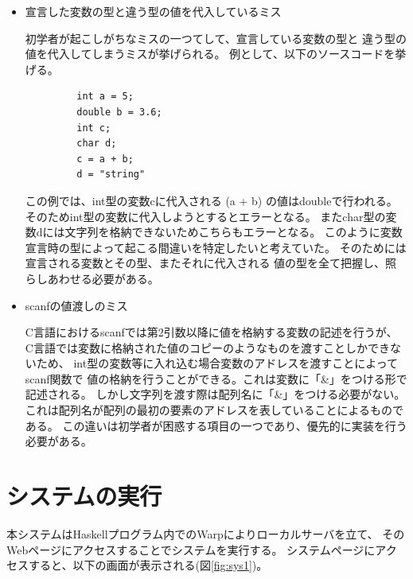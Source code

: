 \documentclass{csspaper}
\begin{document}
\begin{itemize}
         \item 宣言した変数の型と違う型の値を代入しているミス
         
         初学者が起こしがちなミスの一つてして、宣言している変数の型と
         違う型の値を代入してしまうミスが挙げられる。
         例として、以下のソースコードを挙げる。

         \begin{lstlisting}
         int a = 5;
         double b = 3.6;
         int c;
         char d;
         c = a + b;
         d = "string"
         \end{lstlisting}

         この例では、int型の変数cに代入される (a + b) の値はdoubleで行われる。
         そのためint型の変数に代入しようとするとエラーとなる。
         またchar型の変数dには文字列を格納できないためこちらもエラーとなる。
         このように変数宣言時の型によって起こる間違いを特定したいと考えていた。
         そのためには宣言される変数とその型、またそれに代入される
         値の型を全て把握し、照らしあわせる必要がある。

         \item scanfの値渡しのミス
         
         C言語におけるscanfでは第2引数以降に値を格納する変数の記述を行うが、
         C言語では変数に格納された値のコピーのようなものを渡すことしかできないため、
         int型の変数等に入れ込む場合変数のアドレスを渡すことによってscanf関数で
         値の格納を行うことができる。これは変数に「\&」をつける形で記述される。
         しかし文字列を渡す際は配列名に「\&」をつける必要がない。
         これは配列名が配列の最初の要素のアドレスを表していることによるものである。
         この違いは初学者が困惑する項目の一つであり、優先的に実装を行う
         必要がある。

      \end{itemize}

      \section{システムの実行}
      本システムはHaskellプログラム内でのWarpによりローカルサーバを立て、
      そのWebページにアクセスすることでシステムを実行する。
      システムページにアクセスすると、以下の画面が表示される(図\ref{fig:sys1})。
\end{document}
